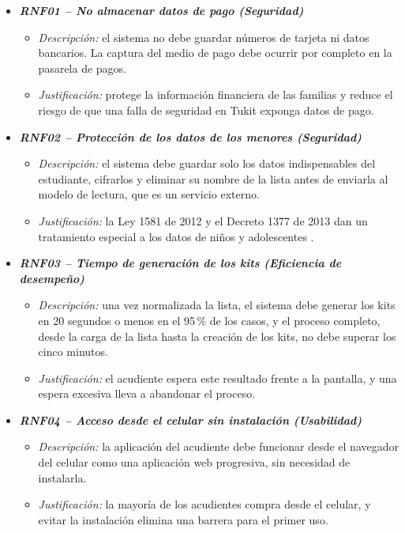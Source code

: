 \begin{itemize}
  \item \textbf{\textit{RNF01 -- No almacenar datos de pago (Seguridad)}}
    \begin{itemize}
      \item \textit{Descripción:} el sistema no debe guardar números de tarjeta ni datos
            bancarios. La captura del medio de pago debe ocurrir por completo en la pasarela
            de pagos.
      \item \textit{Justificación:} protege la información financiera de las familias y
            reduce el riesgo de que una falla de seguridad en Tukit exponga datos de pago.
    \end{itemize}

  \item \textbf{\textit{RNF02 -- Protección de los datos de los menores (Seguridad)}}
    \begin{itemize}
      \item \textit{Descripción:} el sistema debe guardar solo los datos indispensables del
            estudiante, cifrarlos y eliminar su nombre de la lista antes de enviarla al
            modelo de lectura, que es un servicio externo.
      \item \textit{Justificación:} la Ley 1581 de 2012 y el Decreto 1377 de 2013 dan un
            tratamiento especial a los datos de niños y adolescentes
            \citep{congreso_ley1581_2012,presidencia_decreto1377_2013}.
    \end{itemize}

  \item \textbf{\textit{RNF03 -- Tiempo de generación de los kits (Eficiencia de
        desempeño)}}
    \begin{itemize}
      \item \textit{Descripción:} una vez normalizada la lista, el sistema debe generar los
            kits en 20 segundos o menos en el 95\,\% de los casos, y el proceso completo,
            desde la carga de la lista hasta la creación de los kits, no debe superar los
            cinco minutos.
      \item \textit{Justificación:} el acudiente espera este resultado frente a la pantalla,
            y una espera excesiva lleva a abandonar el proceso.
    \end{itemize}

  \item \textbf{\textit{RNF04 -- Acceso desde el celular sin instalación (Usabilidad)}}
    \begin{itemize}
      \item \textit{Descripción:} la aplicación del acudiente debe funcionar desde el
            navegador del celular como una aplicación web progresiva, sin necesidad de
            instalarla.
      \item \textit{Justificación:} la mayoría de los acudientes compra desde el celular, y
            evitar la instalación elimina una barrera para el primer uso.
    \end{itemize}




\end{itemize}
